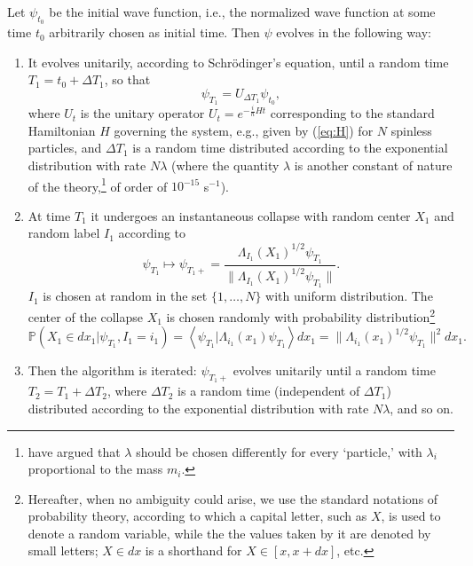\documentclass[12pt]{article}
\begin{document}
Let $\psi_{t_0}$ be the initial wave function, i.e., the normalized wave function at some time $t_0$ arbitrarily chosen as initial time. Then $\psi$ evolves in the following way: 
\begin{enumerate}
\item It evolves unitarily, according to Schr\"odinger's equation, until a random time $T_1= t_0 + \Delta T_1$, so that
\begin{equation}
\psi_{T_1}= U_{\Delta T_1} \psi_{t_0},
\end{equation}
where $U_t$ is the unitary operator $U_t=e^{-\frac{i}{\hbar}Ht}$ corresponding to the standard Hamiltonian $H$ governing the system, e.g., given by (\ref{eq:H}) for $N$ spinless particles, 
and  $\Delta T_1$ is a random time distributed according to the exponential distribution with rate $N\lambda$ (where the quantity $\lambda$ is another constant of nature of the theory,\footnote{\citet{PS94} have argued that $\lambda$ should be chosen differently for every `particle,' with $\lambda_i$ proportional to the mass $m_i$.} of order of $10^{-15}$ s$^{-1}$).
\item At time $T_1$ it undergoes an instantaneous collapse with random center 
 $X_1$ and random label $I_1$ according to
\begin{equation}
\psi_{T_1} \mapsto\psi_{T_1+}= \frac{\Lambda_{I_1} (X_{1})^{1/2}\psi_{T_1}}{\| \Lambda_{I_1} (X_{1})^{1/2} \psi_{T_1} \|}.
\end{equation}
$I_1$ is chosen at random in the set $\{1, \ldots, N\}$ with uniform distribution. The center  of the collapse 
$X_1$ is chosen randomly with probability distribution\footnote{Hereafter, when no ambiguity could arise, we use the standard notations of probability theory, according to which a capital letter, such as $X$, is used to denote a random variable, while the the values taken by it are denoted by small letters; $ X\in dx$ is a shorthand for $X\in [x, x+dx]$, etc. }
\begin{equation}\label{p}
\mathbb{P}(X_1\in dx_{1}|  \psi_{T_1}, I_1=i_1) = \left\langle \psi_{T_1}|\Lambda_{i_1}(x_1)\psi_{T_1}\right\rangle dx_{1}=\|\Lambda_{i_1} (x_1)^{1/2} \psi_{T_1}\|^2 dx_{1}.
\end{equation}
\item Then the algorithm is iterated: $\psi_{T_1+}$ evolves unitarily until a random time $T_2 =  T_1 + \Delta T_2$, where  $\Delta T_2$ is a random time (independent of $\Delta T_1$) distributed according to the exponential distribution with rate $N\lambda$, and so on.
\end{enumerate}
\end{document}
